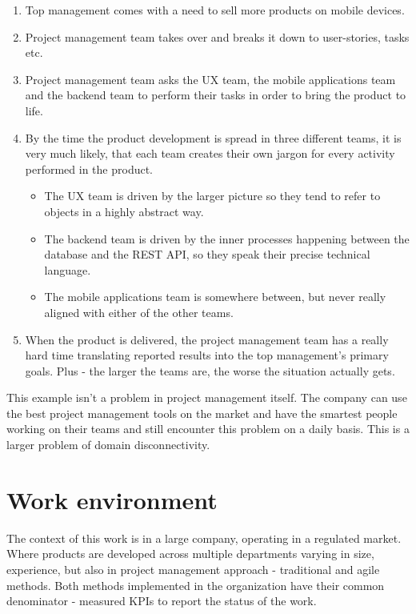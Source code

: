 \begin{enumerate}
	\item Top management comes with a need to sell more products on mobile devices.
	\item Project management team takes over and breaks it down to user-stories, tasks etc.
	\item Project management team asks the UX team, the mobile applications team and the backend team to perform their tasks in order to bring the product to life.
	\item By the time the product development is spread in three different teams, it is very much likely, that each team creates their own jargon for every activity performed in the product.
		\begin{itemize}
			\item The UX team is driven by the larger picture so they tend to refer to objects in a highly abstract way.
			\item The backend team is driven by the inner processes happening between the database and the REST API, so they speak their precise technical language.
			\item The mobile applications team is somewhere between, but never really aligned with either of the other teams.
		\end{itemize}
	\item When the product is delivered, the project management team has a really hard time translating reported results into the top management's primary goals. Plus - the larger the teams are, the worse the situation actually gets.
\end{enumerate}

This example isn't a problem in project management itself. The company can use the best project management tools on the market and have the smartest people working on their teams and still encounter this problem on a daily basis. This is a larger problem of domain disconnectivity.

\section{Work environment}

The context of this work is in a large company, operating in a regulated market. Where products are developed across multiple departments varying in size, experience, but also in project management approach - traditional and agile methods. Both methods implemented in the organization have their common denominator - measured KPIs to report the status of the work.

